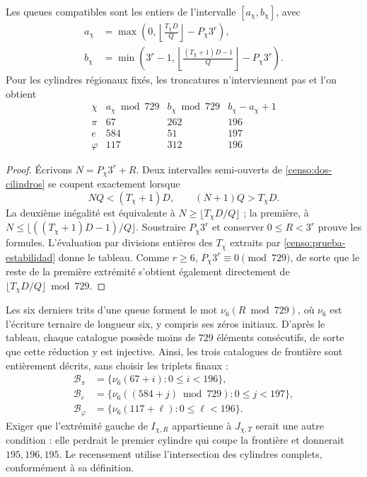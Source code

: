 \begin{proposition}
\label{censo:catalogos}
Les queues compatibles sont les entiers de l'intervalle \([a_\chi,b_\chi]\),
avec
\begin{align}
 a_\chi&=\max\left(0,
       \left\lfloor\frac{T_\chi D}{Q}\right\rfloor-P_\chi3^r\right),
       \label{censo:extremo-a}\\
 b_\chi&=\min\left(3^r-1,
       \left\lfloor\frac{(T_\chi+1)D-1}{Q}\right\rfloor-P_\chi3^r\right).
       \label{censo:extremo-b}
\end{align}
Pour les cylindres régionaux fixés, les troncatures n'interviennent pas et l'on obtient
\begin{equation}
\begin{array}{c|r|r|r}
 \chi&a_\chi\bmod729&b_\chi\bmod729&b_\chi-a_\chi+1\\\hline
 \pi&67&262&196\\
 e&584&51&197\\
 \varphi&117&312&196
\end{array}
\label{censo:tabla-catalogos}
\end{equation}
\end{proposition}
\begin{proof}
Écrivons \(N=P_\chi3^r+R\). Deux intervalles semi-ouverts de
\eqref{censo:dos-cilindros} se coupent exactement lorsque
\[
 NQ<(T_\chi+1)D,\qquad (N+1)Q>T_\chi D.
\]
La deuxième inégalité est équivalente à  
\(N\geq\lfloor T_\chi D/Q\rfloor\) ; la première, à  
\(N\leq\lfloor((T_\chi+1)D-1)/Q\rfloor\). Soustraire  
\(P_\chi3^r\) et conserver \(0\leq R<3^r\) prouve les formules.  
L'évaluation par divisions entières des \(T_\chi\) extraits par  
\eqref{censo:prueba-estabilidad} donne le tableau. Comme \(r\geq6\),  
\(P_\chi3^r\equiv0\pmod{729}\), de sorte que le reste de la première  
extrémité s'obtient également directement de  
\(\lfloor T_\chi D/Q\rfloor\bmod729\).
\end{proof}

Les six derniers trits d'une queue forment le mot
\(\nu_6(R\bmod729)\), où \(\nu_6\) est l'écriture ternaire
de longueur six, y compris ses zéros initiaux. D'après le tableau, chaque
catalogue possède moins de \(729\) éléments consécutifs, de sorte que
cette réduction y est injective. Ainsi, les trois catalogues de frontière
sont entièrement décrits, sans choisir les triplets finaux :
\begin{equation}
 \begin{split}
 \mathcal B_\pi&=\{\nu_6(67+i):0\leq i<196\},\\
 \mathcal B_e&=\{\nu_6((584+j)\bmod729):0\leq j<197\},\\
 \mathcal B_\varphi&=\{\nu_6(117+\ell):0\leq\ell<196\}.
 \end{split}
 \label{censo:fronteras-explicitas}
\end{equation}
Exiger que l'extrémité gauche de \(I_{\chi,R}\) appartienne à
\(J_{\chi,T}\) serait une autre condition : elle perdrait le premier cylindre
qui coupe la frontière et donnerait \(195,196,195\). Le recensement utilise l'intersection des cylindres complets, conformément à sa définition.

